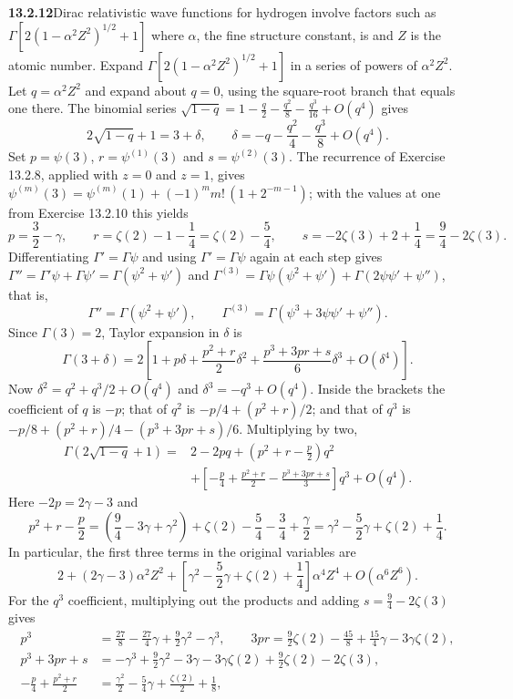 \par\bigskip
\noindent\textbf{13.2.12}\quad Dirac relativistic wave functions for hydrogen
involve factors such as $\Gamma[2(1-\alpha^{2}Z^{2})^{1/2}+1]$ where $\alpha$,
the fine structure constant, is  and $Z$ is the atomic number. Expand
$\Gamma[2(1-\alpha^{2}Z^{2})^{1/2}+1]$ in a series of powers of
$\alpha^{2}Z^{2}$.
\solution
Let $q=\alpha^2Z^2$ and expand about $q=0$, using the square-root
branch that equals one there.  The binomial series
$\sqrt{1-q}=1-\frac q2-\frac{q^2}8-\frac{q^3}{16}+O(q^4)$ gives
\[
2\sqrt{1-q}+1=3+\delta,
\qquad\delta=-q-\frac{q^2}{4}-\frac{q^3}{8}+O(q^4).
\]
Set $p=\psi(3)$, $r=\psi^{(1)}(3)$ and $s=\psi^{(2)}(3)$.
The recurrence of Exercise 13.2.8, applied with $z=0$ and $z=1$,
gives $\psi^{(m)}(3)=\psi^{(m)}(1)+(-1)^mm!\,(1+2^{-m-1})$; with
the values at one from Exercise 13.2.10 this yields
\[
p=\frac32-\gamma,\qquad
r=\zeta(2)-1-\frac14=\zeta(2)-\frac54,
\qquad s=-2\zeta(3)+2+\frac14=\frac94-2\zeta(3).
\]
Differentiating $\Gamma'=\Gamma\psi$ and using $\Gamma'=\Gamma\psi$
again at each step gives
$\Gamma''=\Gamma'\psi+\Gamma\psi'=\Gamma(\psi^2+\psi')$ and
$\Gamma^{(3)}=\Gamma\psi(\psi^2+\psi')+\Gamma(2\psi\psi'+\psi'')$,
that is,
\[
\Gamma''=\Gamma(\psi^2+\psi'),\qquad
\Gamma^{(3)}=\Gamma(\psi^3+3\psi\psi'+\psi'').
\]
Since $\Gamma(3)=2$, Taylor expansion in $\delta$ is
\[
\Gamma(3+\delta)=2\left[1+p\delta+
\frac{p^2+r}{2}\delta^2+
\frac{p^3+3pr+s}{6}\delta^3+O(\delta^4)\right].
\]
Now $\delta^2=q^2+q^3/2+O(q^4)$ and
$\delta^3=-q^3+O(q^4)$.  Inside the brackets the coefficient of $q$
is $-p$; that of $q^2$ is $-p/4+(p^2+r)/2$; and that of $q^3$ is
$-p/8+(p^2+r)/4-(p^3+3pr+s)/6$.  Multiplying by two,
\begin{align*}
\Gamma(2\sqrt{1-q}+1)
={}&2-2pq+\left(p^2+r-\frac p2\right)q^2\\
&+\left[-\frac p4+\frac{p^2+r}{2}
-\frac{p^3+3pr+s}{3}\right]q^3+O(q^4).
\end{align*}
Here $-2p=2\gamma-3$ and
\[
p^2+r-\frac p2
=\left(\frac94-3\gamma+\gamma^2\right)+\zeta(2)-\frac54
-\frac34+\frac\gamma2
=\gamma^2-\frac52\gamma+\zeta(2)+\frac14.
\]
In particular, the first three terms in the original variables are
\[
\boxed{2+(2\gamma-3)\alpha^2Z^2+
\left[\gamma^2-\frac52\gamma+\zeta(2)+\frac14\right]
\alpha^4Z^4+O(\alpha^6Z^6)}.
\]
For the $q^3$ coefficient, multiplying out the products and adding
$s=\tfrac94-2\zeta(3)$ gives
\begin{align*}
p^3&=\frac{27}8-\frac{27}4\gamma+\frac92\gamma^2-\gamma^3,\qquad
3pr=\frac92\zeta(2)-\frac{45}8+\frac{15}4\gamma-3\gamma\zeta(2),\\
p^3+3pr+s&=-\gamma^3+\frac92\gamma^2-3\gamma-3\gamma\zeta(2)
+\frac92\zeta(2)-2\zeta(3),\\
-\frac p4+\frac{p^2+r}2&=\frac{\gamma^2}2-\frac54\gamma
+\frac{\zeta(2)}2+\frac18,
\end{align*}
